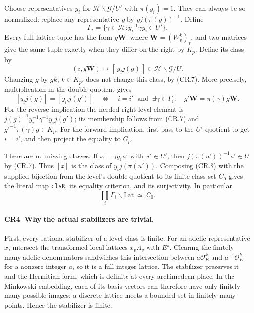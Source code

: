 Choose representatives $y_i$ for $\mathcal H\backslash\mathcal G/U'$
with $\pi(y_i)=1$. They can always be so normalized: replace any
representative $y$ by $yj(\pi(y))^{-1}$. Define
\[
 \Gamma_i=\{\gamma\in\mathcal H:y_i^{-1}\gamma y_i\in U'\}.
\]
Every full lattice tuple has the form $g\mathbf W$, where
$\mathbf W=(W_v^k)_v$, and two matrices give the same tuple exactly
when they differ on the right by $K_p$. Define its class by
\[
 (i,g\mathbf W)\longmapsto[\,y_i j(g)\,]
                        \in\mathcal H\backslash\mathcal G/U.
                                                               \tag{CR.8}
\]
Changing $g$ by $gk$, $k\in K_p$, does not change this class, by
(CR.7). More precisely, multiplication in the double quotient gives
\[
 [y_i j(g)]=[y_{i'}j(g')]
 \quad\Longleftrightarrow\quad
 i=i'\ \text{ and }\
 \exists\gamma\in\Gamma_i:\quad
       g'\mathbf W=\pi(\gamma)g\mathbf W.               \tag{CR.9}
\]
For the reverse implication the needed right-level element is
$j(g)^{-1}y_i^{-1}\gamma^{-1}y_i j(g')$; its membership follows
from (CR.7) and
$g'^{-1}\pi(\gamma)g\in K_p$.
For the forward implication, first pass to the $U'$-quotient to get
$i=i'$, and then project the equality to $G_p$.

There are no missing classes. If $x=\gamma y_i u'$ with $u'\in U'$,
then $j(\pi(u'))^{-1}u'\in U$ by (CR.7). Thus $[x]$ is the class
of $y_i j(\pi(u'))$. Composing (CR.8) with the supplied bijection
from the level's double quotient to its finite class set $C_0$ gives
the literal map \texttt{clsR}, its equality criterion, and its
surjectivity. In particular,
\[
 \coprod_i\Gamma_i\backslash\mathrm{Lat}\ \simeq\ C_0.
                                                               \tag{CR.10}
\]

\paragraph{CR4. Why the actual stabilizers are trivial.}
First, every rational stabilizer of a level class is finite.
For an adelic representative $x$, intersect the transformed local
lattices $x_v\Lambda_v$ with $E^k$. Clearing the finitely many adelic
denominators sandwiches this intersection between
$a\mathcal O_E^k$ and $a^{-1}\mathcal O_E^k$ for a nonzero integer
$a$, so it is a full integer lattice. The stabilizer preserves it
and the Hermitian form, which is definite at every archimedean place.
In the Minkowski embedding, each of its basis vectors can therefore
have only finitely many possible images: a discrete lattice meets
a bounded set in finitely many points. Hence the stabilizer is finite.

